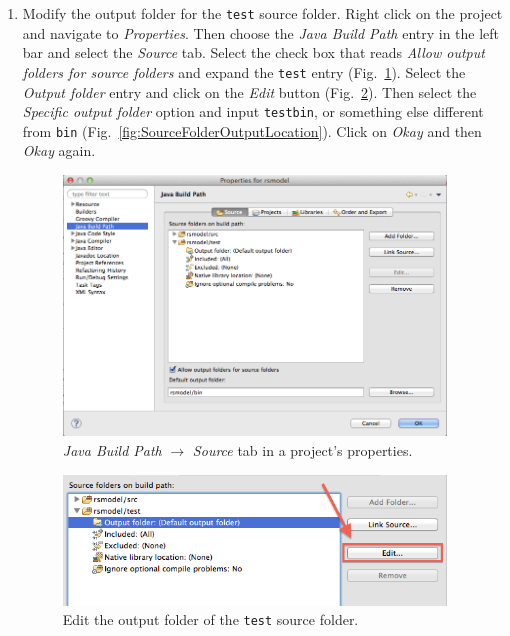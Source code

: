 \documentclass[11pt]{amsart}
\begin{document}
\begin{enumerate}
\item
Modify the output folder for the \texttt{test} source folder. Right click on the project and navigate to \emph{Properties}. Then choose the \emph{Java Build Path} entry in the left bar and select the \emph{Source} tab. Select the check box that reads \emph{Allow output folders for source folders} and expand the \texttt{test} entry (Fig.~\ref{fig:javaBuildPath}). Select the \emph{Output folder} entry and click on the \emph{Edit} button (Fig.~\ref{fig:EditOutputFolder}). Then select the \textit{Specific output folder} option and input \texttt{testbin}, or something else different from \texttt{bin} (Fig.~\ref{fig:SourceFolderOutputLocation}). Click on \emph{Okay} and then \emph{Okay} again.

\begin{figure}
\begin{center}
\vspace{.2in}
\centerline {
\includegraphics[width=4in]{RepastModelTestingImages/javaBuildPath.png}
}
\caption{\emph{Java Build Path} $\rightarrow$ \emph{Source} tab in a project's properties.}
\label{fig:javaBuildPath}
\end{center}
\end{figure}

\begin{figure}
\begin{center}
\vspace{.2in}
\centerline {
\includegraphics[width=4in]{RepastModelTestingImages/EditOutputFolder.png}
}
\caption{Edit the output folder of the \texttt{test} source folder.}
\label{fig:EditOutputFolder}
\end{center}
\end{figure}


\end{enumerate}
\end{document}
